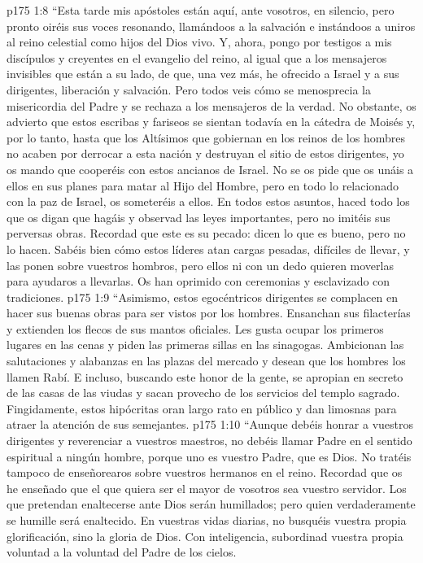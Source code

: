 \vs p175 1:8 “Esta tarde mis apóstoles están aquí, ante vosotros, en silencio, pero pronto oiréis sus voces resonando, llamándoos a la salvación e instándoos a uniros al reino celestial como hijos del Dios vivo. Y, ahora, pongo por testigos a mis discípulos y creyentes en el evangelio del reino, al igual que a los mensajeros invisibles que están a su lado, de que, una vez más, he ofrecido a Israel y a sus dirigentes, liberación y salvación. Pero todos veis cómo se menosprecia la misericordia del Padre y se rechaza a los mensajeros de la verdad. No obstante, os advierto que estos escribas y fariseos se sientan todavía en la cátedra de Moisés y, por lo tanto, hasta que los Altísimos que gobiernan en los reinos de los hombres no acaben por derrocar a esta nación y destruyan el sitio de estos dirigentes, yo os mando que cooperéis con estos ancianos de Israel. No se os pide que os unáis a ellos en sus planes para matar al Hijo del Hombre, pero en todo lo relacionado con la paz de Israel, os someteréis a ellos. En todos estos asuntos, haced todo los que os digan que hagáis y observad las leyes importantes, pero no imitéis sus perversas obras. Recordad que este es su pecado: dicen lo que es bueno, pero no lo hacen. Sabéis bien cómo estos líderes atan cargas pesadas, difíciles de llevar, y las ponen sobre vuestros hombros, pero ellos ni con un dedo quieren moverlas para ayudaros a llevarlas. Os han oprimido con ceremonias y esclavizado con tradiciones.
\vs p175 1:9 “Asimismo, estos egocéntricos dirigentes se complacen en hacer sus buenas obras para ser vistos por los hombres. Ensanchan sus filacterías y extienden los flecos de sus mantos oficiales. Les gusta ocupar los primeros lugares en las cenas y piden las primeras sillas en las sinagogas. Ambicionan las salutaciones y alabanzas en las plazas del mercado y desean que los hombres los llamen Rabí. E incluso, buscando este honor de la gente, se apropian en secreto de las casas de las viudas y sacan provecho de los servicios del templo sagrado. Fingidamente, estos hipócritas oran largo rato en público y dan limosnas para atraer la atención de sus semejantes.
\vs p175 1:10 “Aunque debéis honrar a vuestros dirigentes y reverenciar a vuestros maestros, no debéis llamar Padre en el sentido espiritual a ningún hombre, porque uno es vuestro Padre, que es Dios. No tratéis tampoco de enseñorearos sobre vuestros hermanos en el reino. Recordad que os he enseñado que el que quiera ser el mayor de vosotros sea vuestro servidor. Los que pretendan enaltecerse ante Dios serán humillados; pero quien verdaderamente se humille será enaltecido. En vuestras vidas diarias, no busquéis vuestra propia glorificación, sino la gloria de Dios. Con inteligencia, subordinad vuestra propia voluntad a la voluntad del Padre de los cielos.
